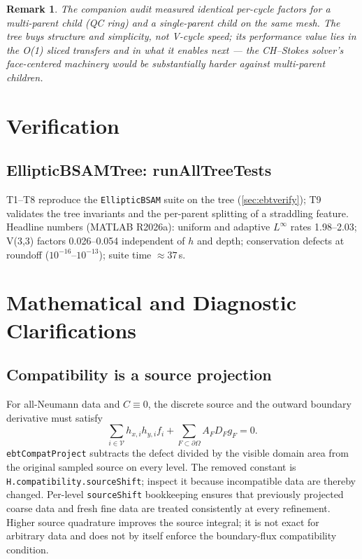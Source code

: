 \documentclass[11pt,oneside,openany]{book}
\newcommand{\code}[1]{\textnormal{\texttt{#1}}}
\newtheorem{remark}{Remark}[chapter]
\begin{document}
\begin{remark}
The companion audit measured identical per-cycle factors for a
multi-parent child (QC ring) and a single-parent child on the same
mesh.  The tree buys structure and simplicity, not V-cycle speed; its
performance value lies in the O(1) sliced transfers and in what it
enables next --- the CH--Stokes solver's face-centered machinery would
be substantially harder against multi-parent children.
\end{remark}

\chapter{Verification}
\label{ch:verify}

\section{EllipticBSAMTree: runAllTreeTests}

T1--T8 reproduce the \code{EllipticBSAM} suite on the tree
(\cref{sec:ebtverify}); T9 validates the tree invariants and the
per-parent splitting of a straddling feature.  Headline numbers
(MATLAB R2026a): uniform and adaptive $L^\infty$ rates 1.98--2.03;
V(3,3) factors 0.026--0.054 independent of $h$ and depth; conservation
defects at roundoff ($10^{-16}$--$10^{-13}$); suite time
$\approx37$\,s.

\chapter{Mathematical and Diagnostic Clarifications}
\label{ch:audit2026}
\section{Compatibility is a source projection}
For all-Neumann data and $C\equiv0$, the discrete source and the outward
boundary derivative must satisfy
\[
 \sum_{i\in\mathcal V} h_{x,i}h_{y,i} f_i
 +\sum_{F\subset\partial\Omega} A_F D_F g_F=0.
\]
\code{ebtCompatProject} subtracts the defect divided by the visible
domain area from the original sampled source on every level.  The
removed constant is \code{H.compatibility.sourceShift}; inspect it
because incompatible data are thereby changed.  Per-level
\code{sourceShift} bookkeeping ensures that previously projected
coarse data and fresh fine data are treated consistently at every
refinement.  Higher source quadrature improves the source integral;
it is not exact for arbitrary data and does not by itself enforce the
boundary-flux compatibility condition.
\end{document}
